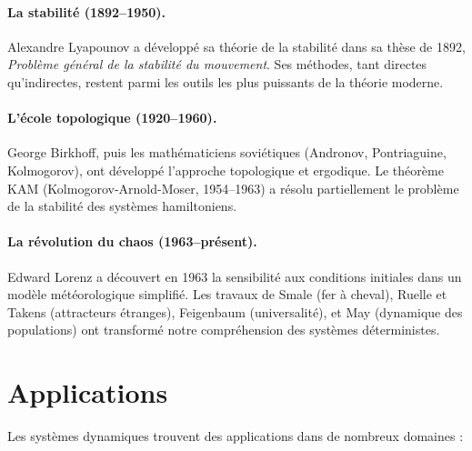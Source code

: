 \paragraph{La stabilit\'e (1892--1950).}
Alexandre Lyapounov a d\'evelopp\'e sa th\'eorie de la stabilit\'e dans sa
th\`ese de 1892, \emph{Probl\`eme g\'en\'eral de la stabilit\'e du
mouvement}. Ses m\'ethodes, tant directes qu'indirectes, restent parmi les
outils les plus puissants de la th\'eorie moderne.

\paragraph{L'\'ecole topologique (1920--1960).}
George Birkhoff, puis les math\'ematiciens sovi\'etiques (Andronov,
Pontriaguine, Kolmogorov), ont d\'evelopp\'e l'approche topologique et
ergodique. Le th\'eor\`eme KAM (Kolmogorov-Arnold-Moser, 1954--1963)
a r\'esolu partiellement le probl\`eme de la stabilit\'e des syst\`emes
hamiltoniens.

\paragraph{La r\'evolution du chaos (1963--pr\'esent).}
Edward Lorenz a d\'ecouvert en 1963 la sensibilit\'e aux conditions initiales
dans un mod\`ele m\'et\'eorologique simplifi\'e. Les travaux de Smale
(fer \`a cheval), Ruelle et Takens (attracteurs \'etranges), Feigenbaum
(universalit\'e), et May (dynamique des populations) ont transform\'e notre
compr\'ehension des syst\`emes d\'eterministes.

\section*{Applications}

Les syst\`emes dynamiques trouvent des applications dans de nombreux domaines :

